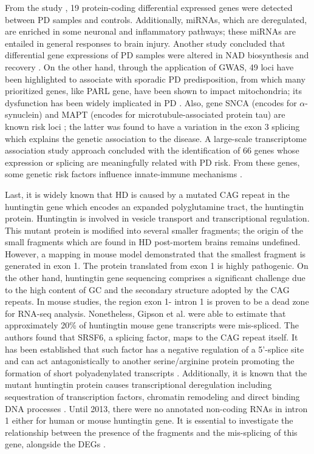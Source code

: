 From the study \cite{Annese}, 19 protein-coding differential expressed genes were detected between PD samples and controls. Additionally, miRNAs, which are deregulated, are enriched in some neuronal and inflammatory pathways; these miRNAs are entailed in general responses to brain injury. Another study concluded that differential gene expressions of PD samples were altered in NAD biosynthesis and recovery \cite{Bennett}. On the other hand, through the application of GWAS, 49 loci have been highlighted to associate with sporadic PD predisposition, from which many prioritized genes, like PARL gene, have been shown to impact mitochondria; its dysfunction has been widely implicated in PD \cite{Hook}. Also, gene SNCA (encodes for $\alpha$-synuclein) and MAPT (encodes for microtubule-associated protein tau) are known risk loci \cite{Bras}; the latter was found to have a variation in the exon 3 splicing which explains the genetic association to the disease. A large-scale transcriptome association study approach concluded with the identification of 66 genes whose expression or splicing are meaningfully related with PD risk. From these genes, some genetic risk factors influence innate-immune mechanisms \cite{Li}.

Last, it is widely known that HD is caused by a mutated CAG repeat in the huntingtin gene which encodes an expanded polyglutamine tract, the huntingtin protein. Huntingtin is involved in vesicle transport and transcriptional regulation. This mutant protein is modified into several smaller fragments; the origin of the small fragments which are found in HD post-mortem brains remains undefined. However, a mapping in mouse model demonstrated that the smallest fragment is generated in exon 1. The protein translated from exon 1 is highly pathogenic. On the other hand, huntingtin gene sequencing comprises a significant challenge due to the high content of GC and the secondary structure adopted by the CAG repeats. In mouse studies, the region exon 1- intron 1 is proven to be a dead zone for RNA-seq analysis. Nonetheless, Gipson et al. were able to estimate that approximately 20\% of huntingtin mouse gene transcripts were mis-spliced. The authors found that SRSF6, a splicing factor, maps to the CAG repeat itself. It has been established that such factor has a negative regulation of a 5’-splice site and can act antagonistically to another serine/arginine protein promoting the formation of short polyadenylated transcripts \cite{Gipson}. Additionally, it is known that the mutant huntingtin protein causes transcriptional deregulation including sequestration of transcription factors, chromatin remodeling and direct binding DNA processes \cite{Miller}. Until 2013, there were no annotated non-coding RNAs in intron 1 either for human or mouse huntingtin gene. It is essential to investigate the relationship between the presence of the fragments and the mis-splicing of this gene, alongside the DEGs \cite{Gipson}.

